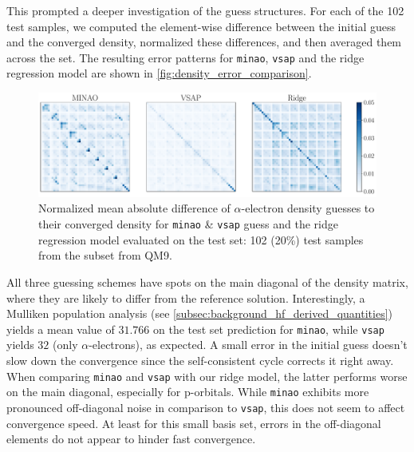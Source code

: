 This prompted a deeper investigation of the guess structures. For each of the 102 test samples, we computed the element-wise difference between the initial guess and the converged density, normalized these differences, and then averaged them across the set. The resulting error patterns for \texttt{minao}, \texttt{vsap} and the ridge regression model are shown in \autoref{fig:density_error_comparison}.
\begin{figure}[H]
    \centering
    \includegraphics[width=\textwidth]{../fig/c5h4n2o2/density_error_comparison.pdf}
    \caption[Normalized difference of density guesses]{Normalized mean absolute difference of $\alpha$-electron density guesses to their converged density for \texttt{minao} \& \texttt{vsap} guess and the ridge regression model evaluated on the test set: 102 (20\%) test samples from the  subset from QM9. \parencite{ref:article1_qm9}}
    \label{fig:density_error_comparison}
\end{figure}
All three guessing schemes have spots on the main diagonal of the density matrix, where they are likely to differ from the reference solution. Interestingly, a Mulliken population analysis (see \autoref{subsec:background_hf_derived_quantities}) \parencite{ref:Mulliken_population_analysis} yields a mean value of $31.766$ on the test set prediction for \texttt{minao}, while \texttt{vsap} yields $32$ (only $\alpha$-electrons), as expected. A small error in the initial guess doesn't slow down the convergence since the self-consistent cycle corrects it right away. When comparing \texttt{minao} and \texttt{vsap} with our ridge model, the latter performs worse on the main diagonal, especially for p-orbitals. While \texttt{minao} exhibits more pronounced off-diagonal noise in comparison to \texttt{vsap}, this does not seem to affect convergence speed. At least for this small basis set, errors in the off-diagonal elements do not appear to hinder fast convergence. %


